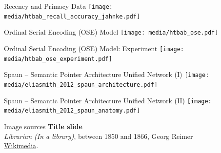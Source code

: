 \documentclass[handout,aspectratio=169]{beamer}
\begin{document}
	\begin{frame}{Recency and Primacy Data}
		\centering
		\texttt{[image: media/htbab\_recall\_accuracy\_jahnke.pdf]}
	\end{frame}

	\begin{frame}{Ordinal Serial Encoding (OSE) Model}
		\centering
		\texttt{[image: media/htbab\_ose.pdf]}
	\end{frame}

	\begin{frame}{Ordinal Serial Encoding (OSE) Model: Experiment}
		\centering
		\texttt{[image: media/htbab\_ose\_experiment.pdf]}
	\end{frame}

  \begin{frame}{Spaun -- Semantic Pointer Architecture Unified Network (I)}
		\centering
		\texttt{[image: media/eliasmith\_2012\_spaun\_architecture.pdf]}
	\end{frame}
	
	\begin{frame}{Spaun -- Semantic Pointer Architecture Unified Network (II)}
		\centering
		\texttt{[image: media/eliasmith\_2012\_spaun\_anatomy.pdf]}
	\end{frame}


	\backupbegin

	\begin{frame}[noframenumbering]{Image sources}
		\small
		\textbf{Title slide}\\\emph{Librarian (In a library)}, between 1850 and 1866,  Georg Reimer\\ \href{https://commons.wikimedia.org/wiki/File:Reimer_Librarian.jpg}{Wikimedia}.
	\end{frame}

	\backupend
	
\end{document}
